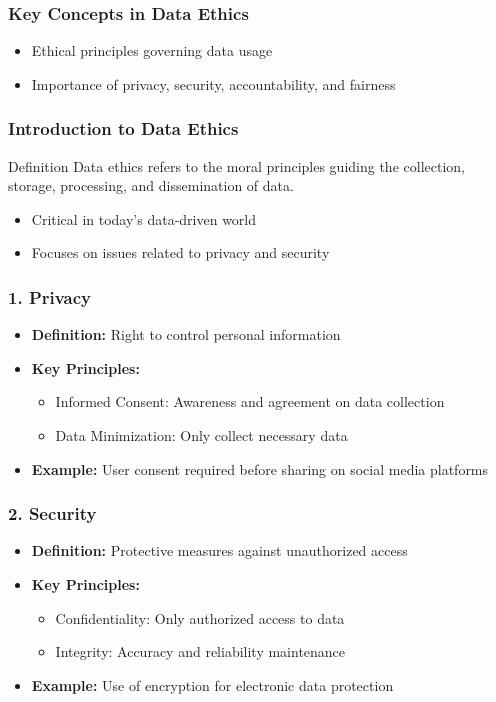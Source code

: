 \documentclass[aspectratio=169]{beamer}
\begin{document}
\begin{frame}[fragile]
    \frametitle{Key Concepts in Data Ethics}
    \begin{itemize}
        \item Ethical principles governing data usage
        \item Importance of privacy, security, accountability, and fairness
    \end{itemize}
\end{frame}

\begin{frame}[fragile]
    \frametitle{Introduction to Data Ethics}
    \begin{block}{Definition}
        Data ethics refers to the moral principles guiding the collection, storage, processing, and dissemination of data.
    \end{block}
    \begin{itemize}
        \item Critical in today's data-driven world
        \item Focuses on issues related to privacy and security
    \end{itemize}
\end{frame}

\begin{frame}[fragile]
    \frametitle{1. Privacy}
    \begin{itemize}
        \item \textbf{Definition:} Right to control personal information
        \item \textbf{Key Principles:}
        \begin{itemize}
            \item Informed Consent: Awareness and agreement on data collection
            \item Data Minimization: Only collect necessary data
        \end{itemize}
        \item \textbf{Example:} User consent required before sharing on social media platforms
    \end{itemize}
\end{frame}

\begin{frame}[fragile]
    \frametitle{2. Security}
    \begin{itemize}
        \item \textbf{Definition:} Protective measures against unauthorized access
        \item \textbf{Key Principles:}
        \begin{itemize}
            \item Confidentiality: Only authorized access to data
            \item Integrity: Accuracy and reliability maintenance
        \end{itemize}
        \item \textbf{Example:} Use of encryption for electronic data protection
    \end{itemize}
\end{frame}
\end{document}
